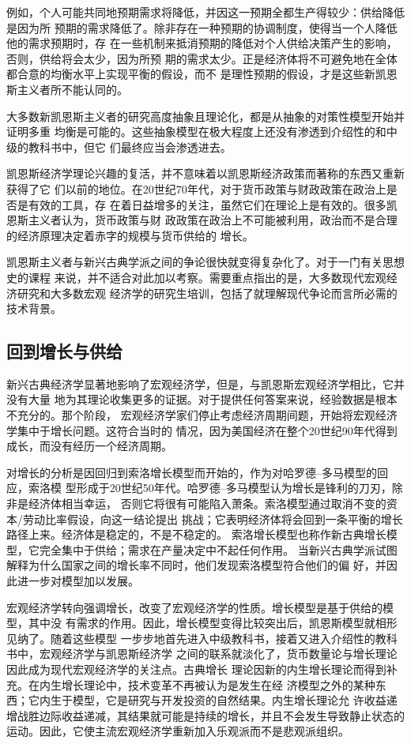 例如，个人可能共同地预期需求将降低，并因这一预期全都生产得较少：供给降低是因为所
预期的需求降低了。除非存在一种预期的协调制度，使得当一个人降低他的需求预期时，存
在一些机制来抵消预期的降低对个人供给决策产生的影响，否则，供给将会太少，因为所预
期的需求太少。正是经济体将不可避免地在全体都合意的均衡水平上实现平衡的假设，而不
是理性预期的假设，才是这些新凯恩斯主义者所不能认同的。

大多数新凯恩斯主义者的研究高度抽象且理论化，都是从抽象的对策性模型开始并证明多重
均衡是可能的。这些抽象模型在极大程度上还没有渗透到介绍性的和中级的教科书中，但它
们最终应当会渗透进去。

凯恩斯经济学理论兴趣的复活，并不意味着以凯恩斯经济政策而著称的东西又重新获得了它
们以前的地位。在20世纪70年代，对于货币政策与财政政策在政治上是否是有效的工具，存
在着日益增多的关注，虽然它们在理论上是有效的。很多凯恩斯主义者认为，货币政策与财
政政策在政治上不可能被利用，政治而不是合理的经济原理决定着赤字的规模与货币供给的
增长。

凯恩斯主义者与新兴古典学派之间的争论很快就变得复杂化了。对于一门有关思想史的课程
来说，并不适合对此加以考察。需要重点指出的是，大多数现代宏观经济研究和大多数宏观
经济学的研究生培训，包括了就理解现代争论而言所必需的技术背景。

\subsection{回到增长与供给}

新兴古典经济学显著地影响了宏观经济学，但是，与凯恩斯宏观经济学相比，它并没有大量
地为其理论收集更多的证据。对于提供任何答案来说，经验数据是根本不充分的。那个阶段，
宏观经济学家们停止考虑经济周期间题，开始将宏观经济学集中于增长问题。这符合当时的
情况，因为美国经济在整个20世纪90年代得到成长，而没有经历一个经济周期。

对增长的分析是因回归到索洛增长模型而开始的，作为对哈罗德--多马模型的回应，索洛模
型形成于20世纪50年代。哈罗德--多马模型认为增长是锋利的刀刃，除非是经济体相当幸运，
否则它将很有可能陷入萧条。索洛模型通过取消不变的资本/劳动比率假设，向这一结论提出
挑战；它表明经济体将会回到一条平衡的增长路径上来。经济体是稳定的，不是不稳定的。
索洛增长模型也称作新古典增长模型，它完全集中于供给；需求在产量决定中不起任何作用。
当新兴古典学派试图解释为什么国家之间的增长率不同时，他们发现索洛模型符合他们的偏
好，并因此进一步对模型加以发展。

宏观经济学转向强调增长，改变了宏观经济学的性质。增长模型是基于供给的模型，其中没
有需求的作用。因此，增长模型变得比较突出后，凯恩斯模型就相形见纳了。随着这些模型
一步步地首先进入中级教科书，接着又进入介绍性的教科书中，宏观经济学与凯恩斯经济学
之间的联系就淡化了，货币数量论与增长理论因此成为现代宏观经济学的关注点。古典增长
理论因新的内生增长理论而得到补充。在内生增长理论中，技术变革不再被认为是发生在经
济模型之外的某种东西；它内生于模型，它是研究与开发投资的自然结果。内生增长理论允
许收益递增战胜边际收益递减，其结果就可能是持续的增长，并且不会发生导致静止状态的
运动。因此，它使主流宏观经济学重新加入乐观派而不是悲观派组织。

